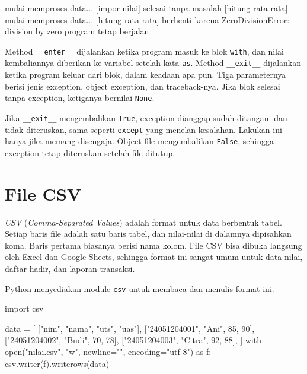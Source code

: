 \begin{keluaran}
 mulai
  memproses data...
[impor nilai] selesai tanpa masalah
[hitung rata-rata] mulai
  memproses data...
[hitung rata-rata] berhenti karena ZeroDivisionError: division by zero
program tetap berjalan
\end{keluaran}

Method \texttt{\_\_enter\_\_} dijalankan ketika program masuk ke blok \texttt{with}, dan nilai kembaliannya diberikan ke variabel setelah kata \texttt{as}. Method \texttt{\_\_exit\_\_} dijalankan ketika program keluar dari blok, dalam keadaan apa pun. Tiga parameternya berisi jenis exception, object exception, dan traceback-nya. Jika blok selesai tanpa exception, ketiganya bernilai \texttt{None}.

\begin{penting}
Jika \texttt{\_\_exit\_\_} mengembalikan \texttt{True}, exception dianggap sudah ditangani dan tidak diteruskan, sama seperti \texttt{except} yang menelan kesalahan. Lakukan ini hanya jika memang disengaja. Object file mengembalikan \texttt{False}, sehingga exception tetap diteruskan setelah file ditutup.
\end{penting}

\section{File CSV}

\emph{CSV} (\emph{Comma-Separated Values}) adalah format untuk data berbentuk tabel. Setiap baris file adalah satu baris tabel, dan nilai-nilai di dalamnya dipisahkan koma. Baris pertama biasanya berisi nama kolom. File CSV bisa dibuka langsung oleh Excel dan Google Sheets, sehingga format ini sangat umum untuk data nilai, daftar hadir, dan laporan transaksi.

Python menyediakan module \texttt{csv} untuk membaca dan menulis format ini.

\begin{kode}
import csv

data = [
    ["nim", "nama", "uts", "uas"],
    ["24051204001", "Ani", 85, 90],
    ["24051204002", "Budi", 70, 78],
    ["24051204003", "Citra", 92, 88],
]
with open("nilai.csv", "w", newline="", encoding="utf-8") as f:
    csv.writer(f).writerows(data)
\end{kode}


